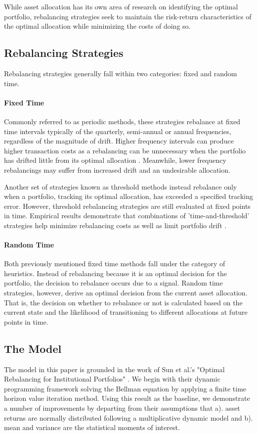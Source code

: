\documentclass{article}
\begin{document}
While asset allocation has its own area of research on identifying the optimal portfolio, rebalancing strategies seek to maintain the risk-return characteristics of the optimal allocation while minimizing the costs of doing so.

\subsection{Rebalancing Strategies}

Rebalancing strategies generally fall within two categories: fixed and random time.

\paragraph{Fixed Time} Commonly referred to as periodic methods, these strategies rebalance at fixed time intervals typically of the quarterly, semi-annual or annual frequencies, regardless of the magnitude of drift. Higher frequency intervals can produce higher transaction costs as a rebalancing can be unnecessary when the portfolio has drifted little from its optimal allocation \cite{b1} \cite{b5}. Meanwhile, lower frequency rebalancings may suffer from increased drift and an undesirable allocation. 

Another set of strategies known as threshold methods instead rebalance only when a portfolio, tracking its optimal allocation, has exceeded a specified tracking error. However, threshold rebalancing strategies are still evaluated at fixed points in time. Empirical results demonstrate that combinations of 'time-and-threshold' strategies help minimize rebalancing costs as well as limit portfolio drift \cite{b1}.

\paragraph{Random Time} Both previously mentioned fixed time methods fall under the category of heuristics. Instead of rebalancing because it is an optimal decision for the portfolio, the decision to rebalance occurs due to a signal. Random time strategies, however, derive an optimal decision from the current asset allocation. That is, the decision on whether to rebalance or not is calculated based on the current state and the likelihood of transitioning to different allocations at future points in time. 

\subsection{The Model} The model in this paper is grounded in the work of Sun et al.'s "Optimal Rebalancing for Institutional Portfolios" \cite{b5}. We begin with their dynamic programming framework solving the Bellman equation by applying a finite time horizon value iteration method. Using this result as the baseline, we demonstrate a number of improvements by departing from their assumptions that a). asset returns are normally distributed following a multiplicative dynamic model and b). mean and variance are the statistical moments of interest.
\end{document}
